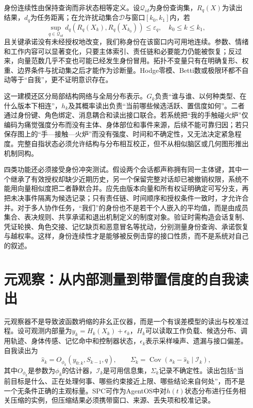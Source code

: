 身份连续性由保持查询而非状态相等定义。设$\mathcal{Q}_{id}$为身份查询集，$R_q(X)$为读出结果，$d_q$为任务距离；在允许扰动集合$\mathcal{D}$与窗口$[k_0,k_1]$内，若
\begin{equation}
\sup_{q\in\mathcal{Q}_{id}}d_q\!\left(R_q(X_k),R_q(X_{k_0})\right)\leq\varepsilon_q,
\quad k_0\leq k\leq k_1,
\end{equation}
且关键承诺没有未经授权地改变，我们称身份在该窗口内可用地连续。参数、情绪和工作内容可以显著变化，只要主体索引、责任链和必要能力仍能被恢复；反过来，向量范数几乎不变也可能已经发生身份冒用。拓扑不变量只有在明确复形、权重、边界条件与扰动集之后才能作为诊断量。Hodge零模、Betti数或极限环都不自动等于“自我”，更不证明意识存在。

这一建模还区分局部结构网络与全局分布表示。$G_k$负责“谁与谁、以何种类型、在什么版本下相连”，$h_k$及其概率读出负责“当前哪些候选活跃、置信度如何”。二者通过身份键、角色绑定、消息耦合和读出接口联合。若系统把“我的手触碰火炉”仅编码为痛觉强度分布而没有主体、身体部位和事件来源，后续不能可靠归因；若只保存图上的“手—接触—火炉”而没有强度、时间和不确定性，又无法决定紧急程度。完整自指状态必须允许结构与分布相互校正，但不从相似脑区或几何图形推出机制同构。

四类功能还必须接受身份冲突测试。假设两个会话都声称拥有同一主体键，其中一个继承了有效授权却缺少近期历史，另一个保留完整对话却已被撤销权限，系统不能用向量相似度把二者静默合并。应先由版本向量和所有权证明确定可写分支，再把未决事件隔离为候选记录；只有责任链、时间顺序和授权条件一致时，才允许合并。对于多人协作任务，“我们”的身份也不是若干个人嵌入的平均值，而是由成员集合、表决规则、共享承诺和退出机制定义的制度对象。验证时需构造会话复制、凭证轮换、角色交接、记忆缺页和恶意冒名等扰动，分别测量身份查询、承诺恢复与越权率。这样，身份连续性才是能够被反例击穿的接口性质，而不是系统对自己的叙述。

\section{元观察：从内部测量到带置信度的自我读出}
\label{sec:measurement_phase_transition_and_energy_splitting}

元观察器不是导致波函数坍缩的非幺正仪器，而是一个有误差模型的读出与校准过程。设可观测内部量为$y_k=H_k(X_k)+\epsilon_k$，$H_k$可以读取工作负载、候选分布、调用轨迹、身体传感、记忆命中和控制器状态，$\epsilon_k$表示采样噪声、遗漏与接口偏差。自我读出为
\begin{equation}
\hat{s}_k=O_{\phi_k}(y_{0:k},S_{k-1},q),\qquad
\Sigma_k=\operatorname{Cov}(s_k-\hat{s}_k\mid\mathcal{I}_k),
\end{equation}
其中$O_{\phi_k}$是参数为$\phi_k$的估计器，$\mathcal{I}_k$是可用信息集，$\Sigma_k$记录不确定性。读出包括“当前目标是什么、正在处理何事、哪些约束接近上限、哪些结论来自何处”，而不是一个无条件正确的主观标量。SPC可作为AgentOS中对$h(t)$状态分布进行任务相关压缩的实例，但压缩结果必须携带窗口、来源、丢失项和校准记录。

